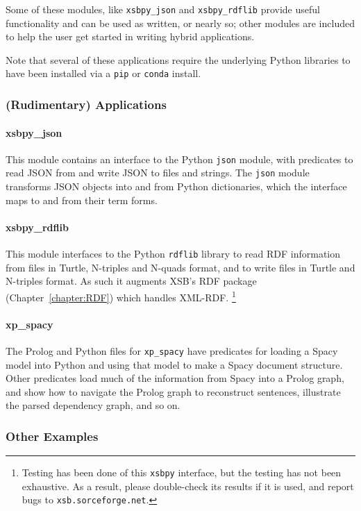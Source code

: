 Some of these modules, like {\tt xsbpy\_json} and {\tt xsbpy\_rdflib}
provide useful functionality and can be used as written, or nearly so;
other modules are included to help the user get started in writing
hybrid applications.

Note that several of these applications require the underlying Python
libraries to have been installed via a {\tt pip} or {\tt conda}
install.

\subsubsection{(Rudimentary) Applications}

\paragraph{xsbpy\_json}
This module contains an interface to the Python {\tt json} module,
with predicates to read JSON from and write JSON to files and strings.
The {\tt json} module transforms JSON objects into and from Python
dictionaries, which the interface maps to and from their term forms.

\paragraph{xsbpy\_rdflib}
This module interfaces to the Python {\tt rdflib} library to read RDF
information from files in Turtle, N-triples and N-quads format, and to
write files in Turtle and N-triples format.  As such it augments XSB's
RDF package (Chapter~\ref{chapter:RDF}) which handles
XML-RDF. \footnote{Testing has been done of this {\tt xsbpy}
  interface, but the testing has not been exhaustive.  As a result,
  please double-check its results if it is used, and report bugs to
  {\tt xsb.sorceforge.net}.}

\paragraph{xp\_spacy}
The Prolog and Python files for {\tt xp\_spacy} have predicates for
loading a Spacy model into Python and using that model to make a Spacy
document structure.  Other predicates load much of the information
from Spacy into a Prolog graph, and show how to navigate the Prolog
graph to reconstruct sentences, illustrate the parsed dependency graph,
and so on.

\subsubsection{Other Examples}

